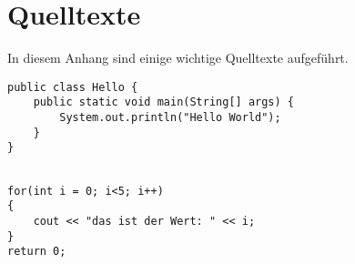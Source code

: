\chapter{Quelltexte}

In diesem Anhang sind einige wichtige Quelltexte aufgeführt.

\begin{lstlisting}
public class Hello {
    public static void main(String[] args) {
        System.out.println("Hello World");
    }
}
\end{lstlisting}


\lstset{language=C++}          %

\begin{lstlisting}[frame=single]  % Start your code-block

for(int i = 0; i<5; i++)
{
	cout << "das ist der Wert: " << i;
}
return 0;
\end{lstlisting}
